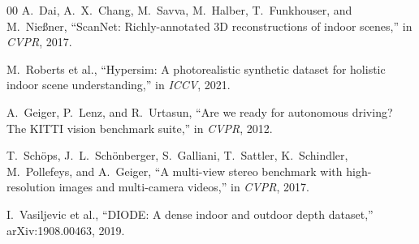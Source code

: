 \documentclass[conference]{IEEEtran}
\begin{document}
\begin{thebibliography}{00}
 A.~Dai, A.~X.~Chang, M.~Savva, M.~Halber, T.~Funkhouser, and
M.~Nie{\ss}ner, ``ScanNet: Richly-annotated 3D reconstructions of indoor
scenes,'' in \emph{CVPR}, 2017.

 M.~Roberts et al., ``Hypersim: A photorealistic synthetic
dataset for holistic indoor scene understanding,'' in \emph{ICCV}, 2021.

 A.~Geiger, P.~Lenz, and R.~Urtasun, ``Are we ready for
autonomous driving? The KITTI vision benchmark suite,'' in \emph{CVPR},
2012.

 T.~Sch{\"o}ps, J.~L.~Sch{\"o}nberger, S.~Galliani, T.~Sattler,
K.~Schindler, M.~Pollefeys, and A.~Geiger, ``A multi-view stereo benchmark
with high-resolution images and multi-camera videos,'' in \emph{CVPR}, 2017.

 I.~Vasiljevic et al., ``DIODE: A dense indoor and outdoor
depth dataset,'' arXiv:1908.00463, 2019.

\end{thebibliography}
\end{document}

